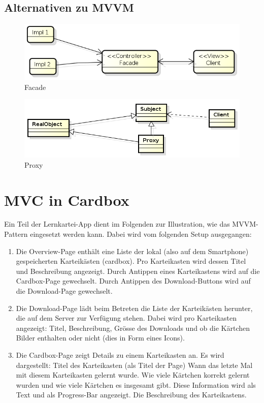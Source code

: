 \documentclass[a4paper,10pt]{scrreprt}
\begin{document}
\subsection{Alternativen zu MVVM}
\begin{figure}[h!]
 \centering
 \includegraphics[scale=.40]{./fpat.png}
	\caption{Facade}
\end{figure}
\begin{figure}[h!]
 \centering
 \includegraphics[scale=.40]{./proxy.png}
\caption{Proxy}
\end{figure}
\section{MVC in Cardbox}
Ein Teil der Lernkartei-App dient im Folgenden zur Illustration, wie das MVVM-Pattern eingesetzt werden kann.
Dabei wird vom folgenden Setup ausgegangen:

\begin{enumerate}
\item Die Overview-Page enthält eine Liste der lokal (also auf dem Smartphone) gespeicherten Karteikästen
(cardbox). Pro Karteikasten wird dessen Titel und Beschreibung angezeigt.
Durch Antippen eines Karteikastens wird auf die Cardbox-Page gewechselt.
Durch Antippen des Download-Buttons wird auf die Download-Page gewechselt.
\item Die Download-Page lädt beim Betreten die Liste der Karteikästen herunter, die auf dem Server zur
Verfügung stehen. Dabei wird pro Karteikasten angezeigt: Titel, Beschreibung, Grösse des Downloads und
ob die Kärtchen Bilder enthalten oder nicht (dies in Form eines Icons).
\item  Die Cardbox-Page zeigt Details zu einem Karteikasten an. Es wird dargestellt:
\subitem Titel des Karteikasten (als Titel der Page)
\subitem Wann das letzte Mal mit diesem Karteikasten gelernt wurde.
\subitem Wie viele Kärtchen korrekt gelernt wurden und wie viele Kärtchen es insgesamt gibt. Diese
Information wird als Text und als Progress-Bar angezeigt.
\subitem Die Beschreibung des Karteikastens.
\end{enumerate}
\end{document}
